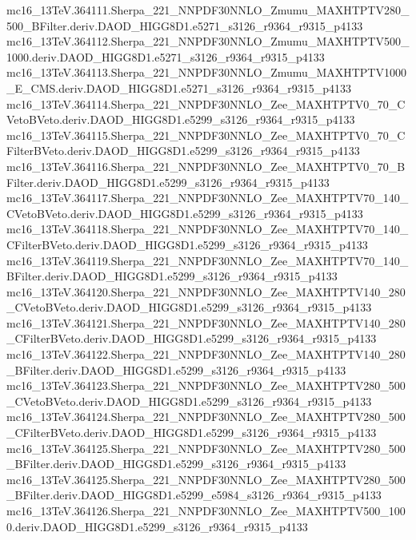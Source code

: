 mc16_13TeV.364111.Sherpa_221_NNPDF30NNLO_Zmumu_MAXHTPTV280_500_BFilter.deriv.DAOD_HIGG8D1.e5271_s3126_r9364_r9315_p4133 \\
mc16_13TeV.364112.Sherpa_221_NNPDF30NNLO_Zmumu_MAXHTPTV500_1000.deriv.DAOD_HIGG8D1.e5271_s3126_r9364_r9315_p4133 \\
mc16_13TeV.364113.Sherpa_221_NNPDF30NNLO_Zmumu_MAXHTPTV1000_E_CMS.deriv.DAOD_HIGG8D1.e5271_s3126_r9364_r9315_p4133 \\
mc16_13TeV.364114.Sherpa_221_NNPDF30NNLO_Zee_MAXHTPTV0_70_CVetoBVeto.deriv.DAOD_HIGG8D1.e5299_s3126_r9364_r9315_p4133 \\
mc16_13TeV.364115.Sherpa_221_NNPDF30NNLO_Zee_MAXHTPTV0_70_CFilterBVeto.deriv.DAOD_HIGG8D1.e5299_s3126_r9364_r9315_p4133 \\
mc16_13TeV.364116.Sherpa_221_NNPDF30NNLO_Zee_MAXHTPTV0_70_BFilter.deriv.DAOD_HIGG8D1.e5299_s3126_r9364_r9315_p4133 \\
mc16_13TeV.364117.Sherpa_221_NNPDF30NNLO_Zee_MAXHTPTV70_140_CVetoBVeto.deriv.DAOD_HIGG8D1.e5299_s3126_r9364_r9315_p4133 \\
mc16_13TeV.364118.Sherpa_221_NNPDF30NNLO_Zee_MAXHTPTV70_140_CFilterBVeto.deriv.DAOD_HIGG8D1.e5299_s3126_r9364_r9315_p4133 \\
mc16_13TeV.364119.Sherpa_221_NNPDF30NNLO_Zee_MAXHTPTV70_140_BFilter.deriv.DAOD_HIGG8D1.e5299_s3126_r9364_r9315_p4133 \\
mc16_13TeV.364120.Sherpa_221_NNPDF30NNLO_Zee_MAXHTPTV140_280_CVetoBVeto.deriv.DAOD_HIGG8D1.e5299_s3126_r9364_r9315_p4133 \\
mc16_13TeV.364121.Sherpa_221_NNPDF30NNLO_Zee_MAXHTPTV140_280_CFilterBVeto.deriv.DAOD_HIGG8D1.e5299_s3126_r9364_r9315_p4133 \\
mc16_13TeV.364122.Sherpa_221_NNPDF30NNLO_Zee_MAXHTPTV140_280_BFilter.deriv.DAOD_HIGG8D1.e5299_s3126_r9364_r9315_p4133 \\
mc16_13TeV.364123.Sherpa_221_NNPDF30NNLO_Zee_MAXHTPTV280_500_CVetoBVeto.deriv.DAOD_HIGG8D1.e5299_s3126_r9364_r9315_p4133 \\
mc16_13TeV.364124.Sherpa_221_NNPDF30NNLO_Zee_MAXHTPTV280_500_CFilterBVeto.deriv.DAOD_HIGG8D1.e5299_s3126_r9364_r9315_p4133 \\
mc16_13TeV.364125.Sherpa_221_NNPDF30NNLO_Zee_MAXHTPTV280_500_BFilter.deriv.DAOD_HIGG8D1.e5299_s3126_r9364_r9315_p4133 \\
mc16_13TeV.364125.Sherpa_221_NNPDF30NNLO_Zee_MAXHTPTV280_500_BFilter.deriv.DAOD_HIGG8D1.e5299_e5984_s3126_r9364_r9315_p4133 \\
mc16_13TeV.364126.Sherpa_221_NNPDF30NNLO_Zee_MAXHTPTV500_1000.deriv.DAOD_HIGG8D1.e5299_s3126_r9364_r9315_p4133 \\
